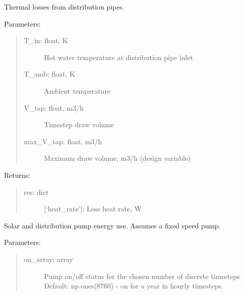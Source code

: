 \documentclass[letterpaper,10pt,english,openany]{sphinxmanual}
\begin{document}
\begin{fulllineitems}
\begin{fulllineitems}
\label{\detokenize{source/mswh.system:mswh.system.components.Distribution.pipe_losses}}
Thermal losses from distribution pipes.

Parameters:
\begin{quote}
\begin{description}
\item[{T\_in: float, K}] \leavevmode
Hot water temperature at distribution pipe inlet

\item[{T\_amb: float, K}] \leavevmode
Ambient temperature

\item[{V\_tap: float, m3/h}] \leavevmode
Timestep draw volume

\item[{max\_V\_tap: float, m3/h}] \leavevmode
Maximum draw volume, m3/h (design variable)

\end{description}
\end{quote}

Returns:
\begin{quote}
\begin{description}
\item[{res: dict}] \leavevmode
{[}‘heat\_rate’{]}: Loss heat rate, W

\end{description}
\end{quote}

\end{fulllineitems}


\begin{fulllineitems}
\label{\detokenize{source/mswh.system:mswh.system.components.Distribution.pump}}
Solar and distribution pump energy use.
Assumes a fixed speed pump.

Parameters:
\begin{quote}
\begin{description}
\item[{on\_array: array}] \leavevmode
Pump on/off status for the chosen number of discrete
timesteps
Default: np.ones(8760) - on for a year in hourly timesteps.


\end{description}
\end{quote}
\end{fulllineitems}
\end{fulllineitems}
\end{document}
